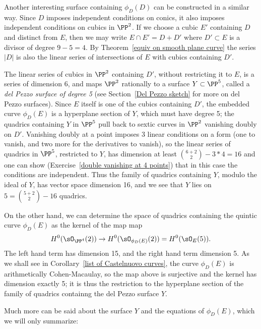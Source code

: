 Another interesting surface containing $\phi_D(D)$ can be constructed in a similar way.
Since $D$ imposes independent conditions on conics, it also imposes independent conditions on cubics in $\PP^2$.
If we choose a cubic $E'$ containing $D$ and distinct from $E$, then we may write $E\cap E' = D +D'$ where $D'\subset E$
is a divisor of degree $9-5 = 4$.  By Theorem~\ref{equiv on smooth plane curve} 
the series $|D|$ is also the linear series of intersections of $E$ with cubics containing $D'$. 

The linear series of cubics in $\PP^2$ containing $D'$, without restricting it to $E$, is a series of dimension $6$,
and maps $\PP^2$ rationally to a surface $Y\subset \PP^5$, called a \emph{del Pezzo surface of degree 5} (see Section~\ref{Del Pezzo sketch}
for more on del Pezzo surfaces). Since $E$ itself is one of the cubics containing $D'$, the embedded curve $\phi_D(E)$ is a hyperplane section of $Y$, which must have degree 5;  the quadrics containing $Y$ in $\PP^5$ pull back to 
sextic curves in $\PP^2$ vanishing doubly on $D'$. Vanishing doubly at a point imposes
3 linear conditions on a form (one to vanish, and two more for the derivatives to vanish), so the linear series of quadrics in $\PP^5$,
restricted to $Y$, has dimension at least
$
\binom{6+2}{2} - 3*4 = 16
$
and one can show (Exercise~\ref{double vanishing at 4 points}) that in this case the conditions are independent.
Thus the family of quadrics containing $Y$, modulo the ideal of $Y$, has vector space dimension 16, and we see that
$Y$ lies on $5 = \binom{5+2}{2} - 16$ quadrics.


On the other hand, we can determine the space of quadrics containing the quintic curve $\phi_D(E)$ as the kernel of the map
map 
$$
H^0(\sO_{\PP^4}(2)) \to H^0(\sO_{\phi_D(E)}(2)) = H^0(\sO_{E}(5)).
$$
The left hand term has dimension 15, and the right hand term dimension
5. As we shall see in Corollary~\ref{list of Castelnuovo curves}, the curve
$\phi_D(E)$ is arithmetically Cohen-Macaulay, so the map above is surjective and the kernel has dimension exactly 5; it is
thus the restriction to the hyperplane section of the family of quadrics containng the del Pezzo surface $Y$.

Much more can be said about the surface $Y$ and the equations of $\phi_D(E)$, which we will only summarize:


